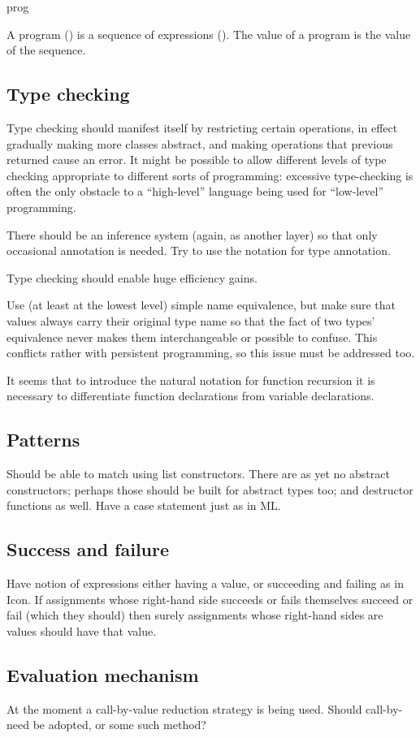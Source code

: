 \documentclass[english]{article}
\newcommand{\cont}{\noindent}
\begin{document}
\begin{bnfc}
\item[prog]
\end{bnfc}

\cont A program () is a sequence of expressions (). The value of a program is the value of the sequence.


\subsection{Type checking}

Type checking should manifest itself by restricting certain operations, in effect gradually making more classes abstract, and making operations that previous returned  cause an error. It might be possible to allow different levels of type checking appropriate to different sorts of programming: excessive type-checking is often the only obstacle to a ``high-level'' language being used for ``low-level'' programming.

There should be an inference system (again, as another layer) so that only occasional annotation is needed. Try to use the  notation for type annotation.

Type checking should enable huge efficiency gains.

Use (at least at the lowest level) simple name equivalence, but make sure that values always carry their original type name so that the fact of two types' equivalence never makes them interchangeable or possible to confuse. This conflicts rather with persistent programming, so this issue must be addressed too.

It seems that to introduce the natural notation for function recursion it is necessary to differentiate function declarations from variable declarations.


\subsection{Patterns}

Should be able to match using list constructors. There are as yet no abstract constructors; perhaps those should be built for abstract types too; and destructor functions as well. Have a case statement just as in ML.


\subsection{Success and failure}

Have notion of expressions either having a value, or succeeding and failing as in Icon. If assignments whose right-hand side succeeds or fails themselves succeed or fail (which they should) then surely assignments whose right-hand sides are values should have that value.


\subsection{Evaluation mechanism}

At the moment a call-by-value reduction strategy is being used. Should call-by-need be adopted, or some such method?
\end{document}
